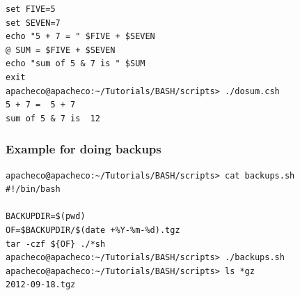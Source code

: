 \documentclass[slidestop,mathserif,compress,xcolor=svgnames]{beamer}
\begin{document}
\begin{frame}
{\begin{verbatim}
set FIVE=5
set SEVEN=7
echo "5 + 7 = " $FIVE + $SEVEN
@ SUM = $FIVE + $SEVEN
echo "sum of 5 & 7 is " $SUM
exit
apacheco@apacheco:~/Tutorials/BASH/scripts> ./dosum.csh 
5 + 7 =  5 + 7
sum of 5 & 7 is  12
    \end{verbatim}
  }
%
\end{frame}


\begin{frame}[fragile]
  \frametitle{\small Example for doing backups}
  {\tiny
  \begin{verbatim}
apacheco@apacheco:~/Tutorials/BASH/scripts> cat backups.sh 
#!/bin/bash

BACKUPDIR=$(pwd)
OF=$BACKUPDIR/$(date +%Y-%m-%d).tgz
tar -czf ${OF} ./*sh
apacheco@apacheco:~/Tutorials/BASH/scripts> ./backups.sh 
apacheco@apacheco:~/Tutorials/BASH/scripts> ls *gz
2012-09-18.tgz
  \end{verbatim}
  }
\end{frame}
\end{document}
